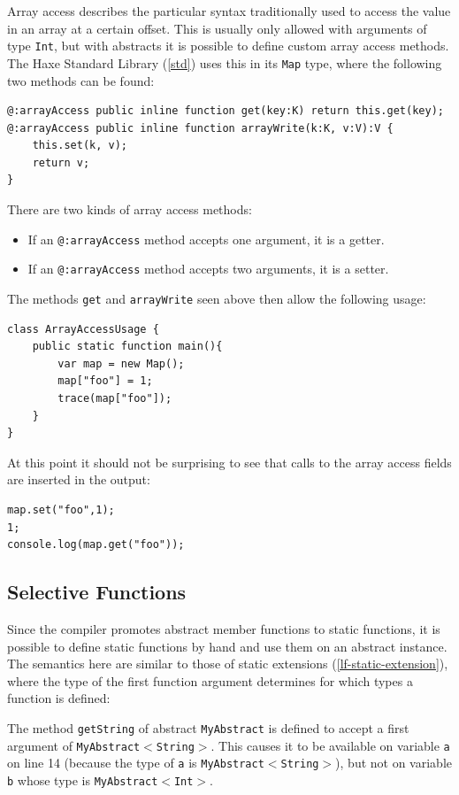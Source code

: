 \documentclass[a4paper,oneside]{book}
\newcommand{\type}[1]{\texttt{#1}}
\newcommand{\expr}[1]{\texttt{#1}}
\newcommand{\tref}[2]{#1 (\ref{#2})}
\newcommand{\haxe}[2][]{%
}
\begin{document}
Array access describes the particular syntax traditionally used to access the value in an array at a certain offset. This is usually only allowed with arguments of type \type{Int}, but with abstracts it is possible to define custom array access methods. The \tref{Haxe Standard Library}{std} uses this in its \type{Map} type, where the following two methods can be found:

\begin{lstlisting}
@:arrayAccess public inline function get(key:K) return this.get(key);
@:arrayAccess public inline function arrayWrite(k:K, v:V):V {
	this.set(k, v);
	return v;
}
\end{lstlisting}
There are two kinds of array access methods:

\begin{itemize}
	\item If an \expr{@:arrayAccess} method accepts one argument, it is a getter.
	\item If an \expr{@:arrayAccess} method accepts two arguments, it is a setter.
\end{itemize}
The methods \expr{get} and \expr{arrayWrite} seen above then allow the following usage:

\begin{lstlisting}
class ArrayAccessUsage {
	public static function main(){
		var map = new Map();
		map["foo"] = 1;
		trace(map["foo"]);
	}
}
\end{lstlisting}
At this point it should not be surprising to see that calls to the array access fields are inserted in the output:

\begin{lstlisting}
map.set("foo",1);
1;
console.log(map.get("foo"));
\end{lstlisting}


\subsection{Selective Functions}
\label{types-abstract-selective-functions}

Since the compiler promotes abstract member functions to static functions, it is possible to define static functions by hand and use them on an abstract instance. The semantics here are similar to those of \tref{static extensions}{lf-static-extension}, where the type of the first function argument determines for which types a function is defined:

\haxe{assets/SelectiveFunction.hx}
The method \expr{getString} of abstract \type{MyAbstract} is defined to accept a first argument of \type{MyAbstract$<$String$>$}. This causes it to be available on variable \expr{a} on line 14 (because the type of \expr{a} is \type{MyAbstract$<$String$>$}), but not on variable \expr{b} whose type is \type{MyAbstract$<$Int$>$}.
\end{document}
